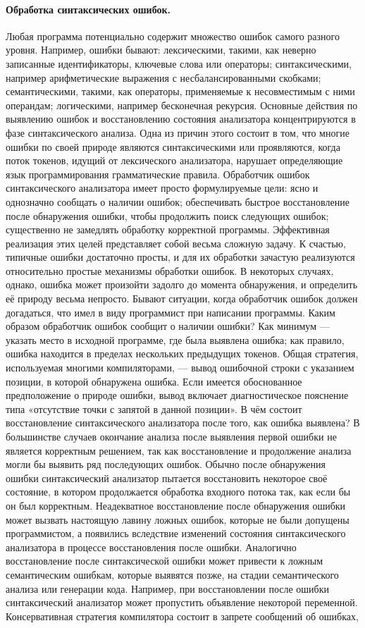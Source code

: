 \documentclass[a4paper,12pt]{article}
\begin{document}
\paragraph{Обработка синтаксических ошибок.}
Любая программа потенциально содержит множество ошибок самого разного уровня. Например, ошибки бывают: лексическими, такими, как неверно записанные идентификаторы, ключевые слова или операторы; синтаксическими, например арифметические выражения с несбалансированными скобками; семантическими, такими, как операторы, применяемые к несовместимым с ними операндам; логическими, например бесконечная рекурсия. Основные действия по выявлению ошибок и восстановлению состояния анализатора концентрируются в фазе синтаксического анализа. Одна из причин этого состоит в том, что многие ошибки по своей природе являются синтаксическими или проявляются, когда поток токенов, идущий от лексического анализатора, нарушает определяющие язык программирования грамматические правила. Обработчик ошибок синтаксического анализатора имеет просто формулируемые цели: ясно и однозначно сообщать о наличии ошибок; обеспечивать быстрое восстановление после обнаружения ошибки, чтобы продолжить поиск следующих ошибок; существенно не замедлять обработку корректной программы. Эффективная реализация этих целей представляет собой весьма сложную задачу. К счастью, типичные ошибки достаточно просты, и для их обработки зачастую реализуются относительно простые механизмы обработки ошибок. В некоторых случаях, однако, ошибка может произойти задолго до момента обнаружения, и определить её природу весьма непросто. Бывают ситуации, когда обработчик ошибок должен догадаться, что имел в виду программист при написании программы. Каким образом обработчик ошибок сообщит о наличии ошибки? Как минимум — указать место в исходной программе, где была выявлена ошибка; как правило, ошибка находится в пределах нескольких предыдущих токенов. Общая стратегия, используемая многими компиляторами, — вывод ошибочной строки с указанием позиции, в которой обнаружена ошибка. Если имеется обоснованное предположение о природе ошибки, вывод включает диагностическое пояснение типа «отсутствие точки с запятой в данной позиции». В чём состоит восстановление синтаксического анализатора после того, как ошибка выявлена? В большинстве случаев окончание анализа после выявления первой ошибки не является корректным решением, так как восстановление и продолжение анализа могли бы выявить ряд последующих ошибок. Обычно после обнаружения ошибки синтаксический анализатор пытается восстановить некоторое своё состояние, в котором продолжается обработка входного потока так, как если бы он был корректным. Неадекватное восстановление после обнаружения ошибки может вызвать настоящую лавину ложных ошибок, которые не были допущены программистом, а появились вследствие изменений состояния синтаксического анализатора в процессе восстановления после ошибки. Аналогично восстановление после синтаксической ошибки может привести к ложным семантическим ошибкам, которые выявятся позже, на стадии семантического анализа или генерации кода. Например, при восстановлении после ошибки синтаксический анализатор может пропустить объявление некоторой переменной. Консервативная стратегия компилятора состоит в запрете сообщений об ошибках, 
\end{document}
